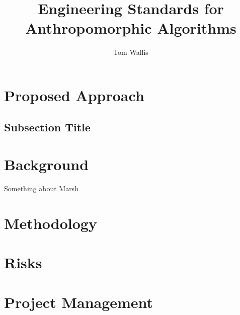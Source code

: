 

\title{Engineering Standards for Anthropomorphic Algorithms}
\author{Tom Wallis}
\date{}
\maketitle


\section{Proposed Approach}
\label{sec:proposed_approach}


\subsection*{Subsection Title}
\label{sec:label-subsection}


\section{Background}
\label{sec:background}

Something about Marsh\cite{marsh1994}

\section{Methodology}
\label{sec:methodology}


\section{Risks}
\label{sec:risks}


\section{Project Management}
\label{sec:project_management}


